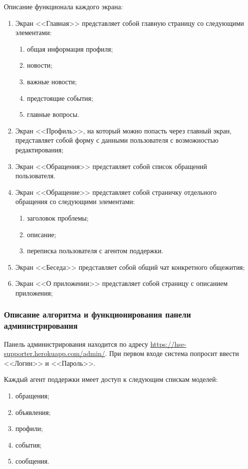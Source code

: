 \documentclass{../includes/TechDoc}
\begin{document}
    Описание функционала каждого экрана:
    \begin{enumerate}
        \item Экран <<Главная>> представляет собой главную страницу со следующими элементами:
        \begin{enumerate}
            \item общая информация профиля;
            \item новости;
            \item важные новости;
            \item предстоящие события;
            \item главные вопросы.
        \end{enumerate}

        \item Экран <<Профиль>>, на который можно попасть через главный экран, представляет собой форму с данными пользователя с возможностью редактирования;
        \item Экран <<Обращения>> представляет собой список обращений пользователя.
        \item Экран <<Обращение>> представляет собой страничку отдельного обращения со следующими элементами:
        \begin{enumerate}
            \item заголовок проблемы;
            \item описание;
            \item переписка пользователя с агентом поддержки.
        \end{enumerate}
        \item Экран <<Беседа>> представляет собой общий чат конкретного общежития;
        \item Экран <<О приложении>> представляет собой страницу с описанием приложения;
    \end{enumerate}

    \subsubsection{Описание алгоритма и функционирования панели администрирования}

    Панель администрирования находится по адресу \url{https://hse-supporter.herokuapp.com/admin/}.
    При первом входе система попросит ввести <<Логин>> и <<Пароль>>.

    Каждый агент поддержки имеет доступ к следующим спискам моделей:
    \begin{enumerate}[noitemsep]
        \item обращения;
        \item объявления;
        \item профили;
        \item события;
        \item сообщения.
    \end{enumerate}
\end{document}
